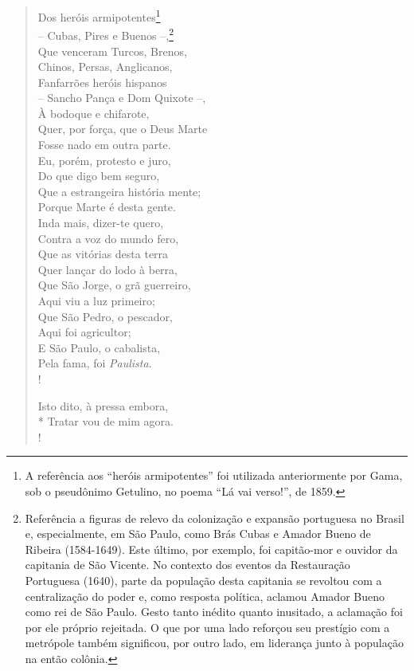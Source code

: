 \begin{verse}
Dos heróis armipotentes\footnote{A referência aos ``heróis
  armipotentes'' foi utilizada anteriormente por Gama, sob o pseudônimo
  Getulino, no poema ``Lá vai verso!'', de 1859.}\\
-- Cubas, Pires e Buenos --,\footnote{ Referência a figuras de relevo
  da colonização e expansão portuguesa no Brasil e, especialmente, em
  São Paulo, como Brás Cubas e Amador Bueno de Ribeira (1584-1649). Este
  último, por exemplo, foi capitão-mor e ouvidor da capitania de São
  Vicente. No contexto dos eventos da Restauração Portuguesa (1640),
  parte da população desta capitania se revoltou com a centralização do
  poder e, como resposta política, aclamou Amador Bueno como rei de São
  Paulo. Gesto tanto inédito quanto inusitado, a aclamação foi por ele
  próprio rejeitada. O que por uma lado reforçou seu prestígio com a
  metrópole também significou, por outro lado, em liderança junto à
  população na então colônia.}\\
Que venceram Turcos, Brenos,\\
Chinos, Persas, Anglicanos,\\
Fanfarrões heróis hispanos\\
-- Sancho Pança e Dom Quixote --,\\
À bodoque e chifarote,\\
Quer, por força, que o Deus Marte\\
Fosse nado em outra parte.\\
Eu, porém, protesto e juro,\\
Do que digo bem seguro,\\
Que a estrangeira história mente;\\
Porque Marte é desta gente.\\
Inda mais, dizer-te quero,\\
Contra a voz do mundo fero,\\
Que as vitórias desta terra\\
Quer lançar do lodo à berra,\\
Que São Jorge, o grã guerreiro,\\
Aqui viu a luz primeiro;\\
Que São Pedro, o pescador,\\
Aqui foi agricultor;\\
E São Paulo, o cabalista,\\
Pela fama, foi \emph{Paulista}.\\!

Isto dito, à pressa embora,\\*
Tratar vou de mim agora.\\!


\end{verse}
